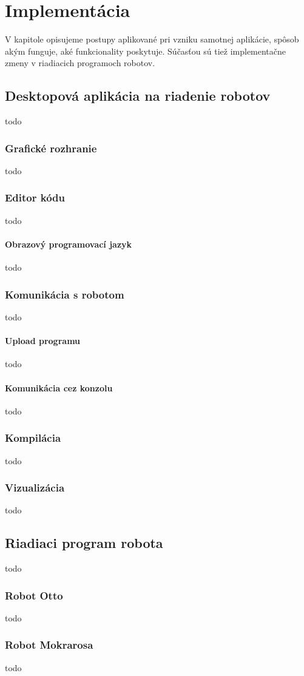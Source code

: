 \chapter{Implementácia}

\label{kap:implementacia}

V kapitole opisujeme postupy aplikované pri vzniku samotnej aplikácie, spôsob akým funguje, aké funkcionality poskytuje. Súčasťou sú tiež implementačne zmeny v riadiacich programoch robotov.

\section{Desktopová aplikácia na riadenie robotov}
todo

\subsection{Grafické rozhranie}
todo

\subsection{Editor kódu}
todo

\subsubsection{Obrazový programovací jazyk}
todo

\subsection{Komunikácia s robotom}
todo

\subsubsection{Upload programu}
todo

\subsubsection{Komunikácia cez konzolu}
todo

\subsection{Kompilácia}
todo

\subsection{Vizualizácia}
todo

\section{Riadiaci program robota}
todo

\subsection{Robot Otto}
todo

\subsection{Robot Mokrarosa}
todo
